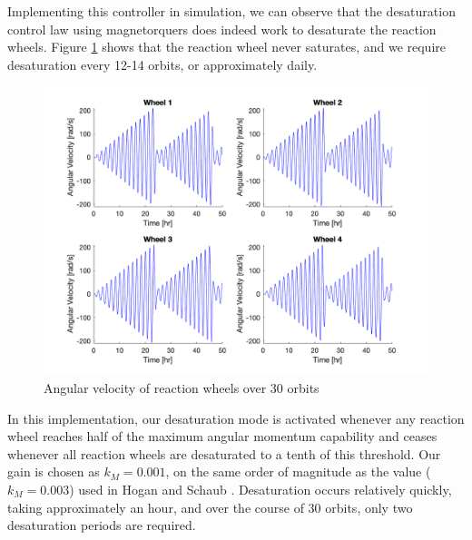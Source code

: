 Implementing this controller in simulation, we can observe that the desaturation control law using magnetorquers does indeed work to desaturate the reaction wheels. Figure \ref{fig:ps10_angular_velocity} shows that the reaction wheel never saturates, and we require desaturation every 12-14 orbits, or approximately daily.

\begin{figure}[H]
\centering
\includegraphics[scale=0.3]{Images/ps10_angular_velocity.png}
\caption{Angular velocity of reaction wheels over 30 orbits}
\label{fig:ps10_angular_velocity}
\end{figure}

In this implementation, our desaturation mode is activated whenever any reaction wheel reaches half of the maximum angular momentum capability and ceases whenever all reaction wheels are desaturated to a tenth of this threshold. Our gain is chosen as $k_{M} = 0.001$, on the same order of magnitude as the value ($k_{M} = 0.003$) used in Hogan and Schaub \cite{Hogan2015}. Desaturation occurs relatively quickly, taking approximately an hour, and over the course of 30 orbits, only two desaturation periods are required.

